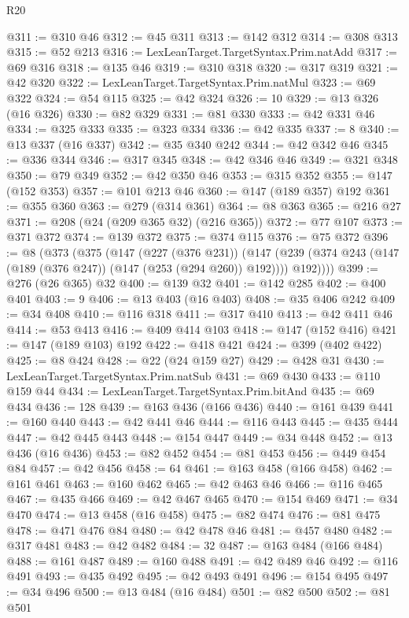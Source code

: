 \begin{lexlean}{R20}
\begin{coremodule}
@311 := @310 @46
@312 := @45 @311
@313 := @142 @312
@314 := @308 @313
@315 := @52 @213
@316 := LexLeanTarget.TargetSyntax.Prim.natAdd
@317 := @69 @316
@318 := @135 @46
@319 := @310 @318
@320 := @317 @319
@321 := @42 @320
@322 := LexLeanTarget.TargetSyntax.Prim.natMul
@323 := @69 @322
@324 := @54 @115
@325 := @42 @324
@326 := 10
@329 := @13 @326 (@16 @326)
@330 := @82 @329
@331 := @81 @330
@333 := @42 @331 @46
@334 := @325 @333
@335 := @323 @334
@336 := @42 @335
@337 := 8
@340 := @13 @337 (@16 @337)
@342 := @35 @340 @242
@344 := @42 @342 @46
@345 := @336 @344
@346 := @317 @345
@348 := @42 @346 @46
@349 := @321 @348
@350 := @79 @349
@352 := @42 @350 @46
@353 := @315 @352
@355 := @147 (@152 @353)
@357 := @101 @213 @46
@360 := @147 (@189 @357) @192
@361 := @355 @360
@363 := @279 (@314 @361)
@364 := @8 @363
@365 := @216 @27
@371 := @208 (@24 (@209 @365 @32) (@216 @365))
@372 := @77 @107
@373 := @371 @372
@374 := @139 @372
@375 := @374 @115
@376 := @75 @372
@396 := @8
    (@373
      (@375
        (@147
          (@227 (@376 @231))
          (@147 (@239 (@374 @243 (@147 (@189 (@376 @247)) (@147 (@253 (@294 @260)) @192)))) @192))))
@399 := @276 (@26 @365) @32
@400 := @139 @32
@401 := @142 @285
@402 := @400 @401
@403 := 9
@406 := @13 @403 (@16 @403)
@408 := @35 @406 @242
@409 := @34 @408
@410 := @116 @318
@411 := @317 @410
@413 := @42 @411 @46
@414 := @53 @413
@416 := @409 @414 @103
@418 := @147 (@152 @416)
@421 := @147 (@189 @103) @192
@422 := @418 @421
@424 := @399 (@402 @422)
@425 := @8 @424
@428 := @22 (@24 @159 @27)
@429 := @428 @31
@430 := LexLeanTarget.TargetSyntax.Prim.natSub
@431 := @69 @430
@433 := @110 @159 @44
@434 := LexLeanTarget.TargetSyntax.Prim.bitAnd
@435 := @69 @434
@436 := 128
@439 := @163 @436 (@166 @436)
@440 := @161 @439
@441 := @160 @440
@443 := @42 @441 @46
@444 := @116 @443
@445 := @435 @444
@447 := @42 @445 @443
@448 := @154 @447
@449 := @34 @448
@452 := @13 @436 (@16 @436)
@453 := @82 @452
@454 := @81 @453
@456 := @449 @454 @84
@457 := @42 @456
@458 := 64
@461 := @163 @458 (@166 @458)
@462 := @161 @461
@463 := @160 @462
@465 := @42 @463 @46
@466 := @116 @465
@467 := @435 @466
@469 := @42 @467 @465
@470 := @154 @469
@471 := @34 @470
@474 := @13 @458 (@16 @458)
@475 := @82 @474
@476 := @81 @475
@478 := @471 @476 @84
@480 := @42 @478 @46
@481 := @457 @480
@482 := @317 @481
@483 := @42 @482
@484 := 32
@487 := @163 @484 (@166 @484)
@488 := @161 @487
@489 := @160 @488
@491 := @42 @489 @46
@492 := @116 @491
@493 := @435 @492
@495 := @42 @493 @491
@496 := @154 @495
@497 := @34 @496
@500 := @13 @484 (@16 @484)
@501 := @82 @500
@502 := @81 @501

\end{coremodule}
\end{lexlean}
